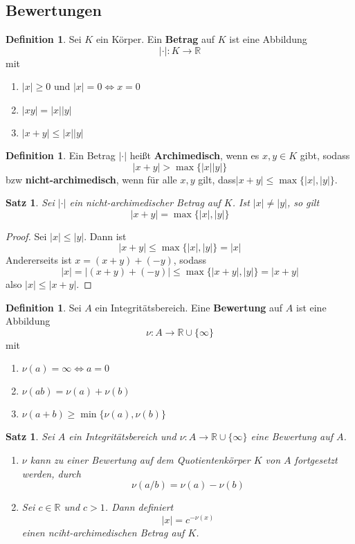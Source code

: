 \documentclass[10pt,a4paper]{article}
\newcommand{\R}{\ensuremath{\mathbb{R}}}
\newcommand{\abs}[1]{\left|#1\right|}
\theoremstyle{plain}
\newtheorem{satz}[theorem]{Satz}
\theoremstyle{definition}
\newtheorem{definition}[theorem]{Definition}
\theoremstyle{remark}
\begin{document}
	
	\subsection{Bewertungen}
	\begin{definition}
		Sei $K$ ein Körper. Ein \textbf{Betrag} auf $K$ ist eine Abbildung
		\[|\cdot|:K\to\R\] mit
		\begin{enumerate}
			\item $\abs{x}\geq 0$ und $\abs{x}=0\Leftrightarrow x=0$
			\item $\abs{xy}=\abs x\abs y$
			\item $\abs{x+y}\leq \abs x\abs y$
		\end{enumerate}
	\end{definition}
	\begin{definition}
		Ein Betrag $\abs{\cdot}$ heißt \textbf{Archimedisch}, wenn es $x,y\in K$ gibt, sodass
		\[\abs{x+y}>\max\{\abs x\abs y\}\]
		bzw \textbf{nicht-archimedisch}, wenn für alle $x,y$ gilt, dass$|x+y|\leq \max\{\abs x,\abs y\}$.
	\end{definition}

	\begin{satz}
		Sei $\abs\cdot$ ein  nicht-archimedischer Betrag auf $K$. Ist $\abs x\neq \abs y$, so gilt
		\[\abs{x+y}=\max\{\abs x,\abs y\}\]
	\end{satz}
	\begin{proof}
		Sei $\abs x\leq \abs y$. Dann ist 
		\[\abs{x+y}\leq\max\{\abs x,\abs y\}=\abs x\]
		Andererseits ist $x=(x+y)+(-y)$, sodass
		\[\abs x=\abs{(x+y)+(-y)}\leq\max\{\abs{x+y},\abs y\}=\abs{x+y}\]
		also $\abs x\leq\abs{x+y}$.
	\end{proof}

	\begin{definition}
		Sei $A$ ein Integritätsbereich. Eine \textbf{Bewertung} auf $A$ ist eine Abbildung
		\[\nu:A\to\R\cup\{\infty\}\]
		mit
		\begin{enumerate}
			\item $\nu(a)=\infty\Leftrightarrow a=0$
			\item $\nu(ab)=\nu(a)+\nu(b)$
			\item $\nu(a+b)\geq\min\{\nu(a),\nu(b)\}$
		\end{enumerate}
	\end{definition}

	\begin{satz}
		Sei $A$ ein Integritätsbereich und $\nu:A\to\R\cup\{\infty\}$ eine Bewertung auf $A$.
		\begin{enumerate}
			\item $\nu$ kann zu einer Bewertung auf dem Quotientenkörper $K$ von $A$ fortgesetzt werden, durch
			\[\nu(a/b)=\nu(a)-\nu(b)\]
			\item Sei $c\in\R$ und $c> 1$. Dann definiert
			\[\abs{x}=c^{-\nu(x)}\]
			einen nciht-archimedischen Betrag auf $K$.
		\end{enumerate}
	\end{satz}
\end{document}
